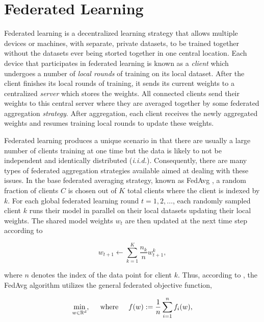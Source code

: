 \documentclass[twocolumn, switch]{article} %
\begin{document}
\section{Federated Learning}

Federated learning is a decentralized learning strategy that allows multiple devices or machines, with separate, private datasets, to be trained together without the datasets ever being storted together in one central location. Each device that participates in federated learning is known as a \textit{client} which undergoes a number of \textit{local rounds} of training on its local dataset. After the client finishes its local rounds of training, it sends its current weights to a centralized \textit{server} which stores the weights. All connected clients send their weights to this central server where they are averaged together by some federated aggregation \textit{strategy}. After aggregation, each client receives the newly aggregated weights and resumes training local rounds to update these weights.

Federated learning produces a unique scenario in that there are usually a large number of clients training at one time but the data is likely to not be independent and identically distributed (\textit{i.i.d.}). Consequently, there are many types of federated aggregation strategies available aimed at dealing with these issues. In the base federated averaging strategy, known as FedAvg \cite{fed_2}, a random fraction of clients $C$ is chosen out of $K$ total clients where the client is indexed by $k$. For each global federated learning round $t=1, 2, \dots$, each randomly sampled client $k$ runs their model in parallel on their local datasets updating their local weights. The shared model weights $w_t$ are then updated at the next time step according to

\begin{equation}
    w_{t+1} \leftarrow \sum_{k=1}^K \frac{n_k}{n} w^k_{t+1}, 
\end{equation}

where $n$ denotes the index of the data point for client $k$. Thus, according to \cite{fed_2}, the FedAvg algorithm utilizes the general federated objective function,

\begin{equation}
    \min_{w \in \mathbb{R}^d},  \hspace{5mm} \text{where} \hspace{5mm} f(w) := \frac{1}{n} \sum_{i=1}^n f_i(w),
\end{equation}
\end{document}

